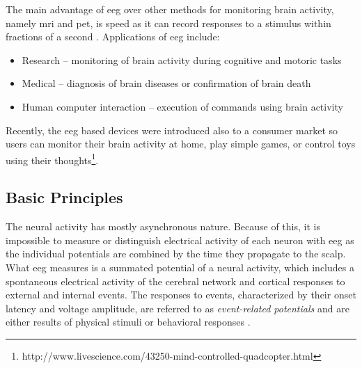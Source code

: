 The main advantage of \gls{eeg} over other methods for monitoring brain activity, namely \gls{mri} and \gls{pet}, is speed as it can record responses
to a stimulus within fractions of a second \cite{eegFund}. Applications of \gls{eeg}
include:
\begin{itemize}
  \item Research -- monitoring of brain activity during cognitive and motoric tasks
  \item Medical -- diagnosis of brain diseases or confirmation of brain death 
  \item Human computer interaction -- execution of commands using brain activity  
\end{itemize}
Recently, the \gls{eeg} based devices were introduced also to a consumer market so users can monitor their brain activity at home, play simple games, or control toys using their thoughts\footnote{http://www.livescience.com/43250-mind-controlled-quadcopter.html}.

\subsection{Basic Principles}
The neural activity has mostly asynchronous nature. Because of this, it is impossible to measure or distinguish electrical activity of each neuron with \gls{eeg} as the individual potentials are combined by the time they propagate to the scalp.
What \gls{eeg} measures is a summated potential of a neural activity, which includes
a spontaneous electrical activity of the cerebral network and cortical responses to
external and internal events. The responses to events, characterized by their
onset latency and voltage amplitude, are referred to as \emph{event-related
potentials} and are either results of physical stimuli or behavioral responses \cite{bcComm}.

